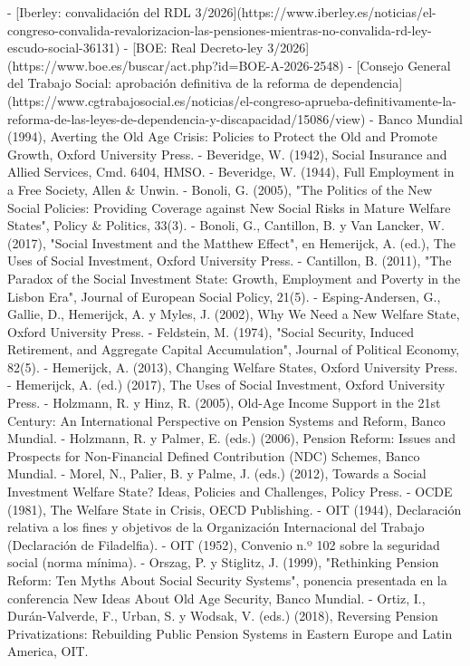 \documentclass[10pt,a4paper]{article}
\begin{document}
- [Iberley: convalidación del RDL 3/2026](https://www.iberley.es/noticias/el-congreso-convalida-revalorizacion-las-pensiones-mientras-no-convalida-rd-ley-escudo-social-36131)
- [BOE: Real Decreto-ley 3/2026](https://www.boe.es/buscar/act.php?id=BOE-A-2026-2548)
- [Consejo General del Trabajo Social: aprobación definitiva de la reforma de dependencia](https://www.cgtrabajosocial.es/noticias/el-congreso-aprueba-definitivamente-la-reforma-de-las-leyes-de-dependencia-y-discapacidad/15086/view)
- Banco Mundial (1994), Averting the Old Age Crisis: Policies to Protect the Old and Promote Growth, Oxford University Press.
- Beveridge, W. (1942), Social Insurance and Allied Services, Cmd. 6404, HMSO.
- Beveridge, W. (1944), Full Employment in a Free Society, Allen & Unwin.
- Bonoli, G. (2005), "The Politics of the New Social Policies: Providing Coverage against New Social Risks in Mature Welfare States", Policy & Politics, 33(3).
- Bonoli, G., Cantillon, B. y Van Lancker, W. (2017), "Social Investment and the Matthew Effect", en Hemerijck, A. (ed.), The Uses of Social Investment, Oxford University Press.
- Cantillon, B. (2011), "The Paradox of the Social Investment State: Growth, Employment and Poverty in the Lisbon Era", Journal of European Social Policy, 21(5).
- Esping-Andersen, G., Gallie, D., Hemerijck, A. y Myles, J. (2002), Why We Need a New Welfare State, Oxford University Press.
- Feldstein, M. (1974), "Social Security, Induced Retirement, and Aggregate Capital Accumulation", Journal of Political Economy, 82(5).
- Hemerijck, A. (2013), Changing Welfare States, Oxford University Press.
- Hemerijck, A. (ed.) (2017), The Uses of Social Investment, Oxford University Press.
- Holzmann, R. y Hinz, R. (2005), Old-Age Income Support in the 21st Century: An International Perspective on Pension Systems and Reform, Banco Mundial.
- Holzmann, R. y Palmer, E. (eds.) (2006), Pension Reform: Issues and Prospects for Non-Financial Defined Contribution (NDC) Schemes, Banco Mundial.
- Morel, N., Palier, B. y Palme, J. (eds.) (2012), Towards a Social Investment Welfare State? Ideas, Policies and Challenges, Policy Press.
- OCDE (1981), The Welfare State in Crisis, OECD Publishing.
- OIT (1944), Declaración relativa a los fines y objetivos de la Organización Internacional del Trabajo (Declaración de Filadelfia).
- OIT (1952), Convenio n.º 102 sobre la seguridad social (norma mínima).
- Orszag, P. y Stiglitz, J. (1999), "Rethinking Pension Reform: Ten Myths About Social Security Systems", ponencia presentada en la conferencia New Ideas About Old Age Security, Banco Mundial.
- Ortiz, I., Durán-Valverde, F., Urban, S. y Wodsak, V. (eds.) (2018), Reversing Pension Privatizations: Rebuilding Public Pension Systems in Eastern Europe and Latin America, OIT.
\end{document}
